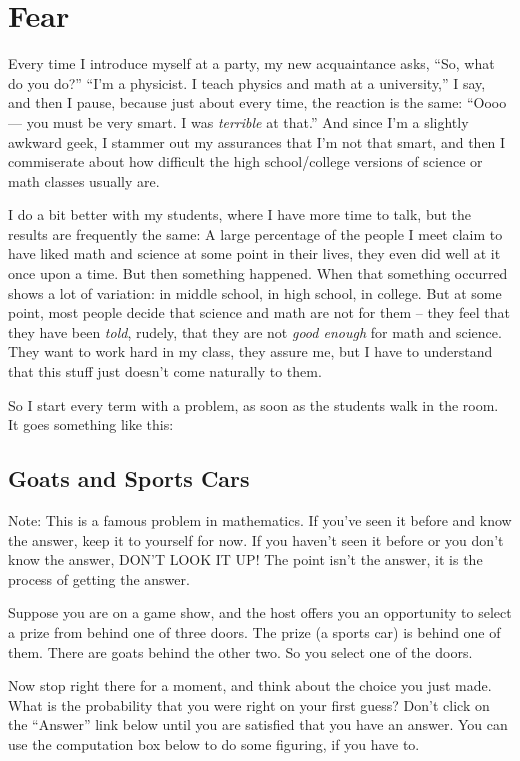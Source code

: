 \section{Fear}

Every time I introduce myself at a party, my new acquaintance asks,
``So, what do you do?''  ``I'm a physicist. I teach physics and math
at a university,'' I say, and then I pause, because just about every
time, the reaction is the same: ``Oooo --- you must be very smart.  I
was \emph{terrible} at that.''  And since I'm a slightly awkward geek,
I stammer out my assurances that I'm not that smart, and then I
commiserate about how difficult the high school/college versions of
science or math classes usually are. 


I do a bit better with my students, where I have more time to talk,
but the results are frequently the same: A large percentage of the
people I meet claim to have liked math and science at some point in
their lives, they even did well at it once upon a time.  But then
something happened.  When that something occurred shows a lot of
variation: in middle school, in high school, in college.  But at some
point, most people decide that science and math are not for them --
they feel that they have been \emph{told}, rudely, that they are not
\emph{good enough} for math and science.  They want to work hard in my
class, they assure me, but I have to understand that this stuff just
doesn't come naturally to them.


So I start every term with a problem, as soon as the students walk in
the room.  It goes something like this:

\subsection{Goats and Sports Cars}
Note: This is a famous problem in mathematics.  If you've seen it
before and know the answer, keep it to yourself for now.  If you
haven't seen it before or you don't know the answer, DON'T LOOK IT UP!
The point isn't the answer, it is the process of getting the answer.

Suppose you are on a game show, and the host offers you an opportunity
to select a prize from behind one of three doors.  The prize (a sports
car) is behind one of them.  There are goats behind the other two.  So
you select one of the doors.

Now stop right there for a moment, and think about the choice you just
made.  What is the probability that you were right on your first
guess?  Don't click on the ``Answer'' link below until you are
satisfied that you have an answer.  You can use the computation box
below to do some figuring, if you have to.


